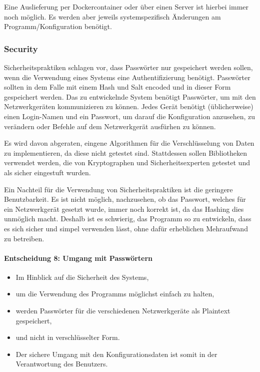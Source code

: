 \documentclass[
	ngerman,
	toc=listof, %
	toc=bibliography, %
	footnotes=multiple, %
	parskip=half, %
	numbers=noendperiod %
]{scrartcl}
\begin{document}
		Eine Auslieferung per Dockercontainer oder über einen Server ist hierbei immer noch möglich. 
		Es werden aber jeweils systemspezifisch Änderungen am Programm/Konfiguration benötigt.
		\newpage

		\subsubsection{Security}
		Sicherheitspraktiken schlagen vor, dass Passwörter nur gespeichert werden sollen, wenn die Verwendung eines Systems eine Authentifizierung benötigt.
		Passwörter sollten in dem Falle mit einem Hash und Salt encoded und in dieser Form gespeichert werden. 
		Das zu entwickelnde System benötigt Passwörter, um mit den Netzwerkgeräten kommunizieren zu können. 
		Jedes Gerät benötigt (üblicherweise) einen Login-Namen und ein Passwort, um darauf die Konfiguration anzusehen, zu verändern oder Befehle auf dem Netzwerkgerät ausfürhen zu können.

		Es wird davon abgeraten, eingene Algorithmen für die Verschlüsselung von Daten zu implementieren, da diese nicht getestet sind. 
		Stattdessen sollen Bibliotheken verwendet werden, die von Kryptographen und Sicherheitsexperten getestet und als sicher eingestuft wurden.

		Ein Nachteil für die Verwendung von Sicherheitspraktiken ist die geringere Benutzbarkeit.
		Es ist nicht möglich, nachzusehen, ob das Passwort, welches für ein Netzwerkgerät gesetzt wurde, immer noch korrekt ist, da das Hashing dies unmöglich macht.
		Deshalb ist es schwierig, das Programm so zu entwickeln, dass es sich sicher und simpel verwenden lässt, ohne dafür erheblichen Mehraufwand zu betreiben.

		\paragraph{Entscheidung 8: Umgang mit Passwörtern}
		\begin{itemize}
			\item Im Hinblick auf die Sicherheit des Systems,
			\item um die Verwendung des Programms möglichst einfach zu halten,
			\item werden Passwörter für die verschiedenen Netzwerkgeräte als Plaintext gespeichert,
			\item und nicht in verschlüsselter Form.
			\item Der sichere Umgang mit den Konfigurationsdaten ist somit in der Verantwortung des Benutzers.
		\end{itemize}
\end{document}

